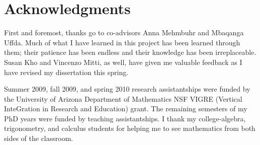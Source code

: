 \chapter*{Acknowledgments}

First and foremost, thanks go to co-advisors Anna Mehmbuhr and Mbaqanga Uffda.
Much of what I have learned in this project has been learned through them;
their patience has been endless and their knowledge has been irreplaceable.
Susan Kho and Vincenzo Mitti, as well, have given me valuable feedback
as I have revised my dissertation this spring.

Summer 2009, fall 2009, and spring 2010 research assistantships were funded by
the University of Arizona Department of Mathematics NSF VIGRE (Vertical
InteGration in Research and Education) grant.  The remaining semesters of
my PhD years were funded by teaching assistantships.  I thank my
college-algebra, trigonometry, and calculus students for helping me to
see mathematics from both sides of the classroom.

\begin{vim_bug_workaround}
\end{vim_bug_workaround}
